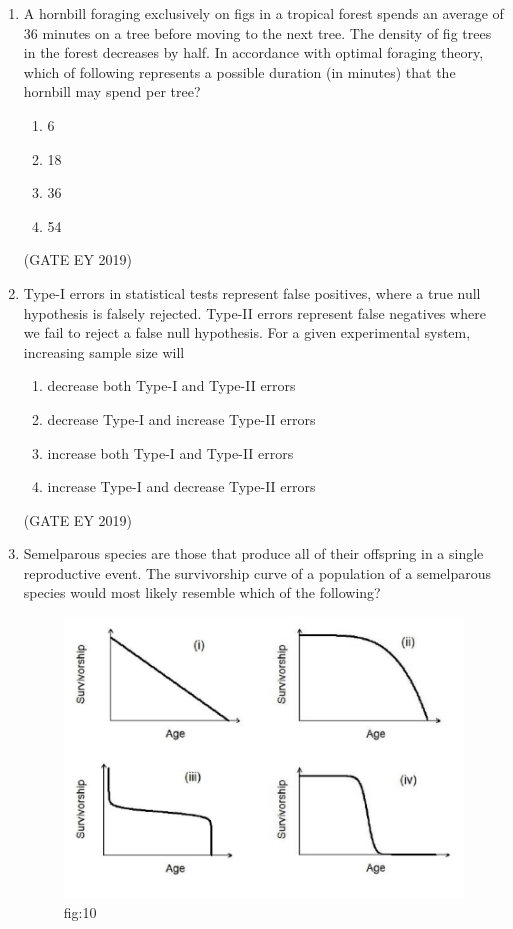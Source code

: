 \documentclass[journal,12pt,onecolumn]{IEEEtran}
\theoremstyle{remark}
\begin{document}
\begin{enumerate}[resume]
\item A hornbill foraging exclusively on figs in a tropical forest spends an average of 36 minutes on a tree before moving to the next tree. The density of fig trees in the forest decreases by half. In accordance with optimal foraging theory, which of following represents a possible duration (in minutes) that the hornbill may spend per tree?

\begin{multicols}{2}
\begin{enumerate}
\item 6
\item 18
\item 36
\item 54
\end{enumerate}
\end{multicols}
\hfill{(GATE EY 2019)}
\item Type-I errors in statistical tests represent false positives, where a true null hypothesis is falsely rejected. Type-II errors represent false negatives where we fail to reject a false null hypothesis. For a given experimental system, increasing sample size will

\begin{multicols}{2}
\begin{enumerate}
\item decrease both Type-I and Type-II errors
\item decrease Type-I and increase Type-II errors
\item increase both Type-I and Type-II errors
\item increase Type-I and decrease Type-II errors
\end{enumerate}
\end{multicols}

\hfill{(GATE EY 2019)}
\item Semelparous species are those that produce all of their offspring in a single reproductive event. The survivorship curve of a population of a semelparous species would most likely resemble which of the following?
\begin{figure}[H]
    \centering
    \includegraphics[]{figs/41.png}
    \caption{fig:10}
\end{figure}


\end{enumerate}
\end{document}
